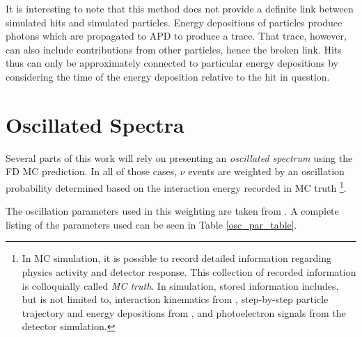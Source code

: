 It is interesting to note that this method does not provide a definite link between simulated hits and simulated particles.  Energy depositions of particles produce photons which are propagated to APD to produce a trace.  That trace, however, can also include contributions from other particles, hence the broken link.  Hits thus can only be approximately connected to particular energy depositions by considering the time of the energy deposition relative to the hit in question.

\section{Oscillated Spectra}
\label{osc_weight_section}

Several parts of this work will rely on presenting an
\textit{oscillated spectrum} using the FD MC prediction.
In all of those cases, $\nu$ events are weighted by an oscillation
probability determined based on the interaction energy recorded in MC truth
\footnote{In MC simulation, it is possible to record detailed information
regarding physics activity and detector response.  This collection
of recorded information is colloquially called \textit{MC truth}.
In \nova simulation, stored information includes, but is not limited to,
interaction kinematics from \genie, step-by-step particle trajectory and energy
depositions from \geant, and photoelectron signals from the detector
simulation.}.

The oscillation parameters used in this weighting are taken from
\cite{pdg, nova2016nue,nova2016numu, bassin2000crust}.
A complete listing of the parameters used can be seen in Table
\ref{osc_par_table}.



